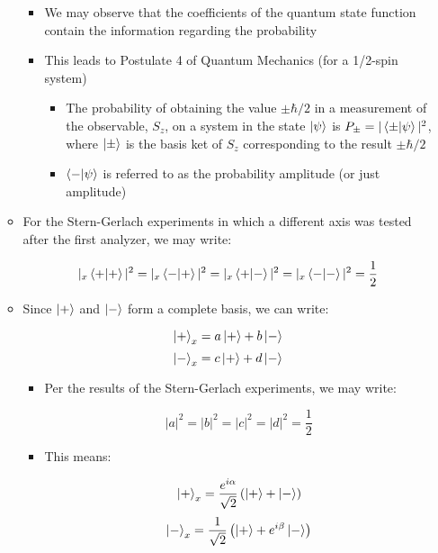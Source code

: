 \begin{itemize}
\begin{itemize}
\begin{itemize}
          \item We may observe that the coefficients of the quantum state function contain the information regarding the probability

          \item This leads to Postulate 4 of Quantum Mechanics (for a 1/2-spin system)

            \begin{itemize}

              \item The probability of obtaining the value $\pm\hbar/2$ in a measurement of the observable, $S_z$, on a system in the state $\ket{\psi}$ is $P_{\pm}=|\bra{\pm}\ket{\psi}|^2$, where $\ket{\pm}$ is the basis ket of $S_z$ corresponding to the result $\pm\hbar/2$

              \item $\bra{-}\ket{\psi}$ is referred to as the probability amplitude (or just amplitude)

            \end{itemize}

        \end{itemize}

      \item For the Stern-Gerlach experiments in which a different axis was tested after the first analyzer, we may write:

        $$|_x\bra{+}\ket{+}|^2=|_x\bra{-}\ket{+}|^2=|_x\bra{+}\ket{-}|^2=|_x\bra{-}\ket{-}|^2=\frac{1}{2}$$

      \item Since $\ket{+}$ and $\ket{-}$ form a complete basis, we can write:

        $$\ket{+}_x=a\ket{+}+b\ket{-}$$
        $$\ket{-}_x=c\ket{+}+d\ket{-}$$

        \begin{itemize}

          \item Per the results of the Stern-Gerlach experiments, we may write:

            $$|a|^2=|b|^2=|c|^2=|d|^2=\frac{1}{2}$$

          \item This means:

            $$\ket{+}_x=\frac{e^{i\alpha}}{\sqrt{2}}\left( \ket{+}+\ket{-} \right)$$
            $$\ket{-}_x=\frac{1}{\sqrt{2}}\left( \ket{+}+e^{i\beta}\ket{-} \right)$$

        \end{itemize}

    \end{itemize}

\end{itemize}



